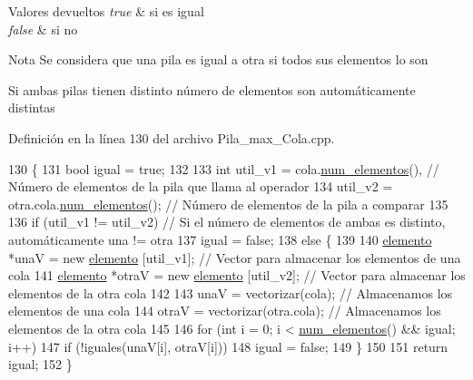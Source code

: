 \begin{DoxyRetVals}{Valores devueltos}
{\em true} & si es igual \\
\hline
{\em false} & si no \\
\hline
\end{DoxyRetVals}
\begin{DoxyNote}{Nota}
Se considera que una pila es igual a otra si todos sus elementos lo son 

Si ambas pilas tienen distinto número de elementos son automáticamente distintas 
\end{DoxyNote}


Definición en la línea 130 del archivo Pila\+\_\+max\+\_\+\+Cola.\+cpp.


\begin{DoxyCode}
130                                                    \{     
131     \textcolor{keywordtype}{bool} igual = \textcolor{keyword}{true};
132 
133     \textcolor{keywordtype}{int} util\_v1 = cola.\hyperlink{classCola_a26e5b0df5411aa23114d790f0a8c023b}{num\_elementos}(),                                         \textcolor{comment}{// Número de
       elementos de la pila que llama al operador}
134         util\_v2 = otra.cola.\hyperlink{classCola_a26e5b0df5411aa23114d790f0a8c023b}{num\_elementos}();                                    \textcolor{comment}{// Número de
       elementos de la pila a comparar}
135 
136     \textcolor{keywordflow}{if} (util\_v1 != util\_v2)                                                     \textcolor{comment}{// Si el número de
       elementos de ambas es distinto, automáticamente una != otra}
137         igual = \textcolor{keyword}{false};
138     \textcolor{keywordflow}{else} \{
139 
140         \hyperlink{structelemento}{elemento} *unaV = \textcolor{keyword}{new} \hyperlink{structelemento}{elemento} [util\_v1];                                \textcolor{comment}{// Vector
       para almacenar los elementos de una cola}
141         \hyperlink{structelemento}{elemento} *otraV = \textcolor{keyword}{new} \hyperlink{structelemento}{elemento} [util\_v2];                               \textcolor{comment}{// Vector
       para almacenar los elementos de la otra cola}
142 
143         unaV = vectorizar(cola);                                                \textcolor{comment}{// Almacenamos los
       elementos de una cola}
144         otraV = vectorizar(otra.cola);                                          \textcolor{comment}{// Almacenamos los
       elementos de la otra cola}
145 
146         \textcolor{keywordflow}{for} (\textcolor{keywordtype}{int} i = 0; i < \hyperlink{classPila__max_a693ba4373cac8db4d820ff6c76d6d8da}{num\_elementos}() && igual; i++)
147             \textcolor{keywordflow}{if} (!iguales(unaV[i], otraV[i]))
148                 igual = \textcolor{keyword}{false};
149     \}
150 
151     \textcolor{keywordflow}{return} igual;
152 \}
\end{DoxyCode}
\mbox{\label{classPila__max_acb56642abe72ba171668295fe04202e1}} 
